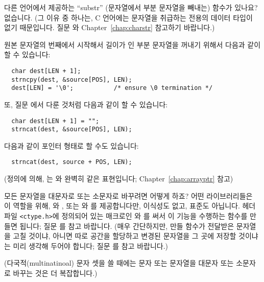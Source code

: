 \begin{faq}
	다른 언어에서 제공하는 ``substr'' (문자열에서 부분 문자열을 빼내는)
        함수가 있나요?
\A
	없습니다. (그 이유 중 하나는, C 언어에는 문자열을 취급하는 전용의
        데이터 타입이 없기 때문입니다. 질문 와 
        Chapter~\ref{chap:charstr} 참고하기 바랍니다.)

        원본 문자열의 번째에서 시작해서 길이가 인 부분 문자열을
        꺼내기 위해서 다음과 같이 할 수 있습니다:
\begin{verbatim}
  char dest[LEN + 1];
  strncpy(dest, &source[POS], LEN);
  dest[LEN] = '\0';           /* ensure \0 termination */
\end{verbatim}
	\noindent 또, 질문 에서 다룬 것처럼 다음과 같이 할 수 있습니다:
\begin{verbatim}
  char dest[LEN + 1] = "";
  strncat(dest, &source[POS], LEN);
\end{verbatim}
	\noindent 다음과 같이 포인터 형태로 할 수도 있습니다:
\begin{verbatim}
  strncat(dest, source + POS, LEN);
\end{verbatim}
	\noindent (정의에 의해, 는 와
        완벽히 같은 표현입니다; Chapter~\ref{chap:arrayptr} 참고)
\end{faq}

\begin{faq}
	모든 문자열을 대문자로 또는 소문자로 바꾸려면 어떻게 하죠?
\A
	어떤 라이브러리들은 이 역할을 위해, 와 , 또는
        와 를 제공합니다만, 이식성도 없고, 표준도
        아닙니다. 헤더 파일 \verb+<ctype.h>+에 정의되어 있는 매크로인 
        와
        를 써서 이 기능을 수행하는 함수를 만들면 됩니다;
        질문 를 참고 바랍니다. (매우 간단하지만, 만들 함수가
        전달받은 문자열을 고칠 것이냐, 아니면 따로 공간을 할당하고 변경된
        문자열을 그 곳에 저장할 것이냐는 미리 생각해 두어야 합니다;
        질문 를 참고 바랍니다.)

        (다국적(multinatinoal) 문자 셋을 쓸 때에는 문자 또는 문자열을
        대문자 또는 소문자로 바꾸는 것은 더 복잡합니다.)
\end{faq}

